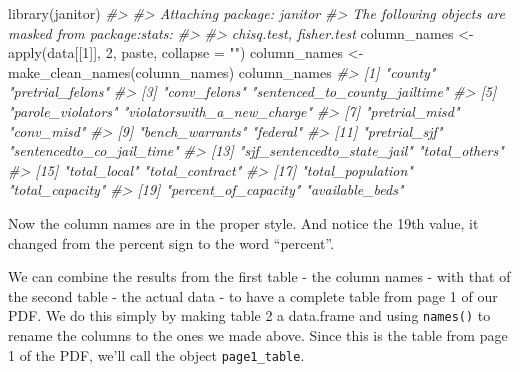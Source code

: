 \documentclass[
  12pt,
]{book}
\newenvironment{Shaded}{\begin{snugshade}}{\end{snugshade}}
\newcommand{\AttributeTok}[1]{\textcolor[rgb]{0.61,0.61,0.61}{#1}}
\newcommand{\CommentTok}[1]{\textcolor[rgb]{0.37,0.37,0.37}{\textit{#1}}}
\newcommand{\DecValTok}[1]{\textcolor[rgb]{0.06,0.06,0.06}{#1}}
\newcommand{\FunctionTok}[1]{\textcolor[rgb]{0,0,0}{#1}}
\newcommand{\NormalTok}[1]{#1}
\newcommand{\OtherTok}[1]{\textcolor[rgb]{0.37,0.37,0.37}{#1}}
\newcommand{\StringTok}[1]{\textcolor[rgb]{0.5,0.5,0.5}{#1}}
\begin{document}
\begin{Shaded}
\begin{Highlighting}[]
\FunctionTok{library}\NormalTok{(janitor)}
\CommentTok{\#\textgreater{} }
\CommentTok{\#\textgreater{} Attaching package: \textquotesingle{}janitor\textquotesingle{}}
\CommentTok{\#\textgreater{} The following objects are masked from \textquotesingle{}package:stats\textquotesingle{}:}
\CommentTok{\#\textgreater{} }
\CommentTok{\#\textgreater{}     chisq.test, fisher.test}
\NormalTok{column\_names }\OtherTok{\textless{}{-}} \FunctionTok{apply}\NormalTok{(data[[}\DecValTok{1}\NormalTok{]], }\DecValTok{2}\NormalTok{, paste, }\AttributeTok{collapse =} \StringTok{""}\NormalTok{)}
\NormalTok{column\_names }\OtherTok{\textless{}{-}} \FunctionTok{make\_clean\_names}\NormalTok{(column\_names)}
\NormalTok{column\_names}
\CommentTok{\#\textgreater{}  [1] "county"                       "pretrial\_felons"             }
\CommentTok{\#\textgreater{}  [3] "conv\_felons"                  "sentenced\_to\_county\_jailtime"}
\CommentTok{\#\textgreater{}  [5] "parole\_violators"             "violatorswith\_a\_new\_charge"  }
\CommentTok{\#\textgreater{}  [7] "pretrial\_misd"                "conv\_misd"                   }
\CommentTok{\#\textgreater{}  [9] "bench\_warrants"               "federal"                     }
\CommentTok{\#\textgreater{} [11] "pretrial\_sjf"                 "sentencedto\_co\_jail\_time"    }
\CommentTok{\#\textgreater{} [13] "sjf\_sentencedto\_state\_jail"   "total\_others"                }
\CommentTok{\#\textgreater{} [15] "total\_local"                  "total\_contract"              }
\CommentTok{\#\textgreater{} [17] "total\_population"             "total\_capacity"              }
\CommentTok{\#\textgreater{} [19] "percent\_of\_capacity"          "available\_beds"}
\end{Highlighting}
\end{Shaded}

Now the column names are in the proper style. And notice the 19th value, it changed from the percent sign to the word ``percent''.

We can combine the results from the first table - the column names - with that of the second table - the actual data - to have a complete table from page 1 of our PDF. We do this simply by making table 2 a data.frame and using \texttt{names()} to rename the columns to the ones we made above. Since this is the table from page 1 of the PDF, we'll call the object \texttt{page1\_table}.
\end{document}
